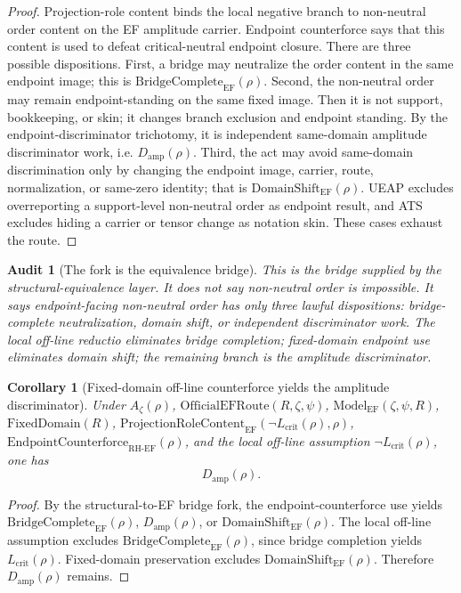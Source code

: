 \documentclass[11pt]{article}
\newtheorem{corollary}{Corollary}[section]
\newtheorem{audit}{Audit}[section]
\newcommand{\Az}{A_{\zeta}}
\newcommand{\Lcrit}{L_{\mathrm{crit}}}
\newcommand{\RH}{\mathrm{RH}}
\newcommand{\EF}{\mathrm{EF}}
\newcommand{\FixedDomain}{\mathrm{FixedDomain}}
\newcommand{\ModelEF}{\mathrm{Model}_{\mathrm{EF}}}
\newcommand{\OfficialEFRoute}{\mathrm{OfficialEFRoute}}
\newcommand{\Damp}{D_{\mathrm{amp}}}
\newcommand{\ProjRoleEF}{\mathrm{ProjectionRoleContent}_{\mathrm{EF}}}
\newcommand{\Counterforce}{\mathrm{EndpointCounterforce}}
\newcommand{\BridgeCompleteEF}{\mathrm{BridgeComplete}_{\mathrm{EF}}}
\newcommand{\DomainShiftEF}{\mathrm{DomainShift}_{\mathrm{EF}}}
\begin{document}
\begin{proof}
Projection-role content binds the local negative branch to non-neutral order content on the EF amplitude carrier.  Endpoint counterforce says that this content is used to defeat critical-neutral endpoint closure.  There are three possible dispositions.  First, a bridge may neutralize the order content in the same endpoint image; this is \(\BridgeCompleteEF(\rho)\).  Second, the non-neutral order may remain endpoint-standing on the same fixed image.  Then it is not support, bookkeeping, or skin; it changes branch exclusion and endpoint standing.  By the endpoint-discriminator trichotomy, it is independent same-domain amplitude discriminator work, i.e. \(\Damp(\rho)\).  Third, the act may avoid same-domain discrimination only by changing the endpoint image, carrier, route, normalization, or same-zero identity; that is \(\DomainShiftEF(\rho)\).  UEAP excludes overreporting a support-level non-neutral order as endpoint result, and ATS excludes hiding a carrier or tensor change as notation skin.  These cases exhaust the route.
\end{proof}

\begin{audit}[The fork is the equivalence bridge]
This is the bridge supplied by the structural-equivalence layer.  It does not say non-neutral order is impossible.  It says endpoint-facing non-neutral order has only three lawful dispositions: bridge-complete neutralization, domain shift, or independent discriminator work.  The local off-line reductio eliminates bridge completion; fixed-domain endpoint use eliminates domain shift; the remaining branch is the amplitude discriminator.
\end{audit}

\begin{corollary}[Fixed-domain off-line counterforce yields the amplitude discriminator]
Under \(\Az(\rho)\), \(\OfficialEFRoute(R,\zeta,\psi)\), \(\ModelEF(\zeta,\psi,R)\), \(\FixedDomain(R)\), \(\ProjRoleEF(\neg\Lcrit(\rho),\rho)\), \(\Counterforce_{\RH\text{-}\EF}(\rho)\), and the local off-line assumption \(\neg\Lcrit(\rho)\), one has
\[
\Damp(\rho).
\]
\end{corollary}

\begin{proof}
By the structural-to-EF bridge fork, the endpoint-counterforce use yields \(\BridgeCompleteEF(\rho)\), \(\Damp(\rho)\), or \(\DomainShiftEF(\rho)\).  The local off-line assumption excludes \(\BridgeCompleteEF(\rho)\), since bridge completion yields \(\Lcrit(\rho)\).  Fixed-domain preservation excludes \(\DomainShiftEF(\rho)\).  Therefore \(\Damp(\rho)\) remains.
\end{proof}
\end{document}
